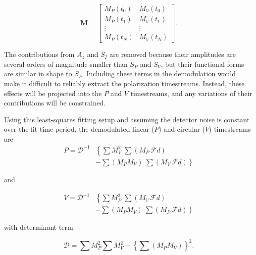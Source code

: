 \documentclass[twocolumn, tighten, numberedappendix, twocolappendix]{aastex63}
\begin{document}
\begin{equation}
\mathbf{M} = 
\begin{bmatrix} 
M_{P}(t_0) & M_{V}(t_0) \\ 
M_{P}(t_1) & M_{V}(t_1) \\ 
\vdots & \vdots \\ 
M_{P}(t_N) & M_{V}(t_N) 
\end{bmatrix}.
\end{equation}

The contributions from $A_z$ and $S_{I}$ are removed because their amplitudes are several orders of magnitude smaller than $S_{P}$ and $S_{V}$, but their functional forms are similar in shape to $S_{P}$. Including these terms in the demodulation would make it difficult to reliably extract the polarization timestreams. Instead, these effects will be projected into the ${P}$ and ${V}$ timestreams, and any variations of their contributions will be constrained.

Using this least-squares fitting setup and assuming the detector noise is constant over the fit time period, the demodulated linear ($P$) and circular ($V$) timestreams are
\begin{equation}
\begin{aligned}
P = \mathcal{D}^{-1} &  \left\{ \textstyle{\sum} M_{V}^2 \; \textstyle{\sum} (M_{P}\,\mathcal{F}d) \right.  \\
 & \left. -\textstyle{\sum} (M_{P} M_{V}) \; \textstyle{\sum} (M_{V}\,\mathcal{F}d) \right\} 
\label{eq:p_demod}
\end{aligned}
\end{equation}

\noindent and

\begin{equation}
\begin{aligned}
V = \mathcal{D}^{-1} & \left\{ \textstyle{\sum} M_{P}^2 \; \textstyle{\sum} (M_{V}\,\mathcal{F}d) \right. \\
& \left. - \textstyle{\sum} (M_{P} M_{V}) \; \textstyle{\sum} (M_{P}\,\mathcal{F}d) \right\} 
\label{eq:v_demod}
\end{aligned}
\end{equation}

\noindent with determinant term

\begin{equation}
\mathcal{D} = \textstyle{\sum} M_{P}^2 \textstyle{\sum} M_{V}^2 - \left\{\textstyle{\sum} (M_{P} M_{V})\right\}^2.
\label{eq:determinant}
\end{equation}
\end{document}

